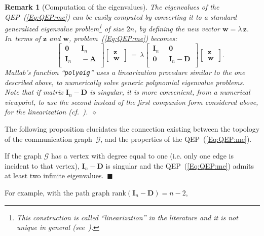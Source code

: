 \documentclass[letterpaper,9pt,twocolumn]{autart}
\newcommand{\vet}[1]{\ensuremath{{\mathbf #1}}}
\newtheorem{remark}{\textbf{Remark}}
\begin{document}
\begin{remark}[Computation of the eigenvalues] The eigenvalues of the QEP~(\ref{Eq:QEP:me}) can be easily computed by converting
it to a standard \emph{generalized eigenvalue problem}\footnote{This construction is called ``linearization''
in the literature and it is not unique in general (see~\cite[Sect.~4.5]{Demmel_book97}).} of size $2n$, by defining the new
vector $\vet{w} = \lambda\,\vet{z}$. In~terms of $\vet{z}$ and
$\vet{w}$, problem~(\ref{Eq:QEP:me}) becomes:
$$
\qquad\;\left[\,
  \begin{matrix}
    \vet{0} \;&\; \vet{I}_n\\
    \vet{I}_n \;&\; -\vet{A} \\
  \end{matrix}
\,\right]\!\left[\,
         \begin{matrix}
           \vet{z}\\
           \vet{w}
         \end{matrix}
       \,\right] \,=\, \lambda\!\left[\,
  \begin{matrix}
    \vet{I}_n \;&\; \vet{0}\\
    \vet{0} \;&\; \vet{I}_n - \vet{D} \\
  \end{matrix}
\,\right]\!\left[\,
         \begin{matrix}
           \vet{z}\\
           \vet{w}
         \end{matrix}
 \,\right]\!.
$$
Matlab's function ``\texttt{polyeig}'' uses a linearization procedure
similar to the one described above, to numerically solve 
generic polynomial eigenvalue problems. Note that if matrix $\vet{I}_n -
\vet{D}$ is singular, it is more convenient, from a numerical
viewpoint, to use the second instead of the first companion form
considered above, for the linearization (cf.~\cite[Sect.~3.4]{TisseurMe_SIAM01}).~\hfill$\diamond$
\end{remark}
The following proposition elucidates the connection existing \mbox{between} the topology of the
communication graph~$\mathcal{G}$, and the properties of the QEP~(\ref{Eq:QEP:me}).
\begin{proposition}
If the graph $\mathcal{G}$ has a vertex with degree equal to one (i.e. only one edge
is incident to that vertex), $\vet{I}_n - \vet{D}$ is singular and the QEP~(\ref{Eq:QEP:me}) admits at least two infinite eigenvalues.~\hfill$\blacksquare$
\end{proposition}
For example, with the path graph $\text{rank}(\vet{I}_n - \vet{D}) = n-2$,
\end{document}
